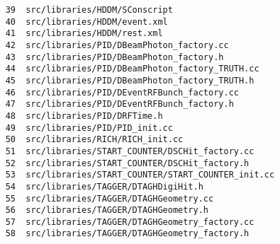 \small
\begin{verbatim}
    39  src/libraries/HDDM/SConscript
    40  src/libraries/HDDM/event.xml
    41  src/libraries/HDDM/rest.xml
    42  src/libraries/PID/DBeamPhoton_factory.cc
    43  src/libraries/PID/DBeamPhoton_factory.h
    44  src/libraries/PID/DBeamPhoton_factory_TRUTH.cc
    45  src/libraries/PID/DBeamPhoton_factory_TRUTH.h
    46  src/libraries/PID/DEventRFBunch_factory.cc
    47  src/libraries/PID/DEventRFBunch_factory.h
    48  src/libraries/PID/DRFTime.h
    49  src/libraries/PID/PID_init.cc
    50  src/libraries/RICH/RICH_init.cc
    51  src/libraries/START_COUNTER/DSCHit_factory.cc
    52  src/libraries/START_COUNTER/DSCHit_factory.h
    53  src/libraries/START_COUNTER/START_COUNTER_init.cc
    54  src/libraries/TAGGER/DTAGHDigiHit.h
    55  src/libraries/TAGGER/DTAGHGeometry.cc
    56  src/libraries/TAGGER/DTAGHGeometry.h
    57  src/libraries/TAGGER/DTAGHGeometry_factory.cc
    58  src/libraries/TAGGER/DTAGHGeometry_factory.h
\end{verbatim}

